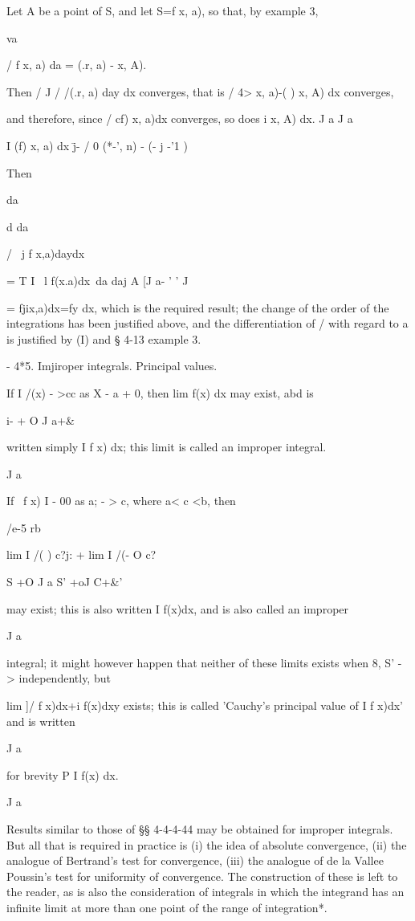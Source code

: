 Let A be a point of S, and let S=f x, a), so that, by example
3,

va

/ f x, a) da = (.r, a) - x, A).

Then / J / /(.r, a) day dx converges, that is / 4> x, a)-( ) x, A) dx
converges,

and therefore, since / cf) x, a)dx converges, so does i x, A) dx. J a
J a

I (f) x, a) dx \=j- / 0 (*-', n) - (- j -'1 ) 

Then

da

d da

/ \ j f x,a)daydx\

= T I \ l f(x.a)dx\ da daj A [J a- ' ' J

= fjix,a)dx=fy dx, which is the required result; the change of the
order of the integrations has been justified above, and the
differentiation of / with regard to a is justified by (I) and §
4-13 example 3.

%
%

- 4*5. Imjiroper integrals. Principal values.

If I /(x) - >cc as X - a + 0, then lim f(x) dx may exist, abd is

i- + O J a+\&

written simply I f x) dx; this limit is called an improper integral.

J a

If \ f x) I - 00 as a; - > c, where a< c <b, then

/e-5 rb

lim I /( ) c?j: + lim I /(- O c?

S +O J a S' +oJ C+\&'

may exist; this is also written I f(x)dx, and is also called an
improper

J a

integral; it might however happen that neither of these limits exists
when 8, S' - > independently, but

lim ]/ f x)dx+i f(x)dxy exists; this is called 'Cauchy's principal
value of I f x)dx' and is written

J a

for brevity P I f(x) dx.

J a

Results similar to those of §§ 4-4-4-44 may be obtained for improper
integrals. But all that is required in practice is (i) the idea of
absolute convergence, (ii) the analogue of Bertrand's test for
convergence, (iii) the analogue of de la Vallee Poussin's test for
uniformity of convergence. The construction of these is left to the
reader, as is also the consideration of integrals in which the
integrand has an infinite limit at more than one point of the range of
integration*.

